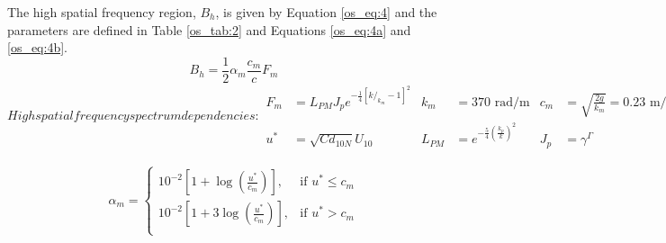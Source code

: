 \renewcommand{\baselinestretch}{2} \small\normalsize
The high spatial frequency region, $B_h$, is given by Equation \ref{os_eq:4} and the parameters are defined in Table \ref{os_tab:2} and Equations \ref{os_eq:4a} and \ref{os_eq:4b}.
\begin{equation}
  \label{os_eq:4}
 B_h = \frac{1}{2} \alpha_m \frac{c_m}{c} F_m
\end{equation}
\renewcommand{\baselinestretch}{2} \small\normalsize
\begin{subequations}
\label{os_eq:4a}
   High spatial frequency spectrum dependencies:
\begin{align}
  F_m &= L_{PM}J_pe^{-\frac{1}{4}\left[k/_{k_m} - 1 \right]^2 } & k_m & = 370 \text{ rad/m} &  c_m &=\sqrt{\frac{2g}{k_m}} = 0.23 \text{ m/s} \\
  u^* &= \sqrt{Cd_{10N}}U_{10}  & L_{PM} &=e^{-\frac{5}{4}\left(\frac{k_p}{k} \right)^2}  &  J_p &= \gamma^\Gamma
\end{align}
\end{subequations}
\renewcommand{\baselinestretch}{2} \small\normalsize

\begin{equation}
\begin{gathered}
  \label{os_eq:4b}
   \alpha_m= \begin{cases}
    10^{-2}\left[1 + \log\left(\frac{u^*}{c_m} \right) \right],& \text{if } u^* \leq c_m\\
    10^{-2}\left[1 + 3\log\left(\frac{u^*}{c_m} \right) \right], & \text{if } u^* > c_m\\
  \end{cases}
\end{gathered}
\end{equation}
\renewcommand{\baselinestretch}{2} \small\normalsize

